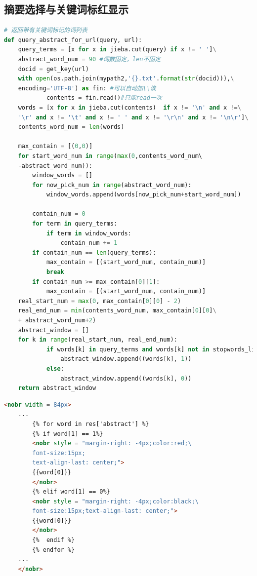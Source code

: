 \documentclass{ctexart}
\begin{document}
\subsection{摘要选择与关键词标红显示} %
\begin{lstlisting}[language=Python]
# 返回带有关键词标记的词列表
def query_abstract_for_url(query, url): 
    query_terms = [x for x in jieba.cut(query) if x != ' ']\
    abstract_word_num = 90 #词数固定，len不固定
    docid = get_key(url)
    with open(os.path.join(mypath2,'{}.txt'.format(str(docid))),\
    encoding='UTF-8') as fin: #可以自动加\\诶
            contents = fin.read()#只能read一次 
    words = [x for x in jieba.cut(contents)  if x != '\n' and x !=\
    '\r' and x != '\t' and x != ' ' and x != '\r\n' and x != '\n\r']\
    contents_word_num = len(words)
    
    max_contain = [(0,0)]
    for start_word_num in range(max(0,contents_word_num\ 
    -abstract_word_num)):
        window_words = []
        for now_pick_num in range(abstract_word_num):
            window_words.append(words[now_pick_num+start_word_num])
            
        contain_num = 0
        for term in query_terms:
            if term in window_words:
                contain_num += 1
        if contain_num == len(query_terms):
            max_contain = [(start_word_num, contain_num)]
            break
        if contain_num >= max_contain[0][1]:
            max_contain = [(start_word_num, contain_num)]
    real_start_num = max(0, max_contain[0][0] - 2)
    real_end_num = min(contents_word_num, max_contain[0][0]\
    + abstract_word_num+2)
    abstract_window = []
    for k in range(real_start_num, real_end_num):
            if words[k] in query_terms and words[k] not in stopwords_list:
                abstract_window.append((words[k], 1))
            else:
                abstract_window.append((words[k], 0))
    return abstract_window
\end{lstlisting}
\begin{lstlisting}[language=html]
    <nobr width = 84px>
    ...
        {% for word in res['abstract'] %}
        {% if word[1] == 1%}
        <nobr style = "margin-right: -4px;color:red;\
        font-size:15px;
        text-align-last: center;">
        {{word[0]}}
        </nobr>
        {% elif word[1] == 0%}
        <nobr style = "margin-right: -4px;color:black;\
        font-size:15px;text-align-last: center;">
        {{word[0]}}
        </nobr>
        {%  endif %}
        {% endfor %} 
    ...
    </nobr>
\end{lstlisting}
\end{document}
